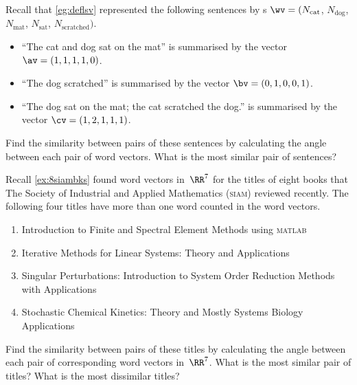 \begin{exercise} \label{ex:} 
Recall that \autoref{eg:deflsv} represented the following sentences by s \(\wv=(N_{\text{cat}}\), \(N_{\text{dog}}\), \(N_{\text{mat}}\), \(N_{\text{sat}}\), \(N_{\text{scratched}})\).
\begin{itemize}
\item ``The cat and dog sat on the mat'' is summarised by the vector \(\av=(1,1,1,1,0)\).
\item ``The dog scratched'' is summarised by the vector \(\bv=(0,1,0,0,1)\).
\item  ``The dog sat on the mat; the cat scratched the dog.'' is summarised by the vector \(\cv=(1,2,1,1,1)\).
\end{itemize}
Find the similarity between pairs of these sentences by calculating the angle between each pair of word vectors.  
What is the most similar pair of sentences?

\end{exercise}



\begin{exercise} \label{ex:} 
Recall \autoref{ex:8siambks} found word vectors in~\(\RR^7\) for the titles of eight books that The Society of Industrial and Applied Mathematics (\textsc{siam}) reviewed recently.
The following four titles have more than one word counted in the word vectors.
\begin{enumerate}
\item Introduction to Finite and Spectral Element Methods using \textsc{matlab}
\item Iterative Methods for Linear Systems: Theory and Applications 
\item Singular Perturbations: Introduction to System Order Reduction Methods with Applications 
\item Stochastic Chemical Kinetics: Theory and Mostly Systems Biology Applications
\end{enumerate}
Find the similarity between pairs of these titles by calculating the angle between each pair of corresponding word vectors in~\(\RR^7\).  What is the most similar pair of titles?  What is the most dissimilar titles?

\end{exercise}



